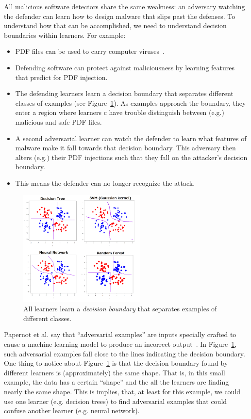 \documentclass{NSF}
\newenvironment{myitemize}
{ \begin{itemize}[topsep=0pt,bottomsep=0pt,itemsep=0,leftmargin=*]
    \setlength{\itemsep}{0pt}
    \setlength{\parskip}{0pt}
    \setlength{\parsep}{0pt}     }
{ \end{itemize}                  }
\newcommand{\bi}{\begin{myitemize}}
\newcommand{\ei}{\end{myitemize}}
\newcommand{\fig}[1]{Figure~\ref{fig:#1}}
\begin{document}
\begin{nsfdescription}
 All  malicious software detectors  share the same weakness: an adversary watching the defender can learn how to design malware that slips past the defenses. To understand how that can be accomplished, we need
 to understand decision boundaries within learners. For example:
\bi
\item
PDF files can be used to carry computer viruses~\cite{smith01}. 
\item
Defending software can protect against maliciousness by learning features that predict for PDF injection.  
\item
The defending learners learn a decision boundary that separates different classes of examples (see \fig{boundary}). As examples approach the boundary, they enter a region where learners c
have trouble distinguish between (e.g.) malicious and safe PDF files. 
\item
A second adversarial learner can watch the defender to learn what features
of malware make it fall towards that  decision boundary.
This adversary then alters (e.g.) their PDF injections such that they fall on the attacker's decision boundary.
\item
This means the defender can no longer recognize the attack.
\ei

\begin{figure}
\includegraphics[width=2.5in]{fig/boundary.png}\caption{All learners learn a {\em decision boundary} that separates examples of different classes. }
\label{fig:boundary}
\end{figure}
Papernot et al. say that   ``adversarial examples'' are  inputs     specially crafted to cause a machine learning model to produce an incorrect output~\cite{papernot2016transferability}.
In \fig{boundary}, such adversarial examples fall
close to the lines indicating the decision boundary.
One thing to notice about \fig{boundary} is that the decision boundary found by different learners is (approximately) the   same shape. That is, in this small example, the data has a certain ``shape'' and the all
the learners are finding nearly the same shape. This is implies, that, at least for this example,
we could use one learner (e.g. decision trees) to find adversarial examples that could confuse
another learner (e.g. neural network). 


\end{nsfdescription}
\end{document}
